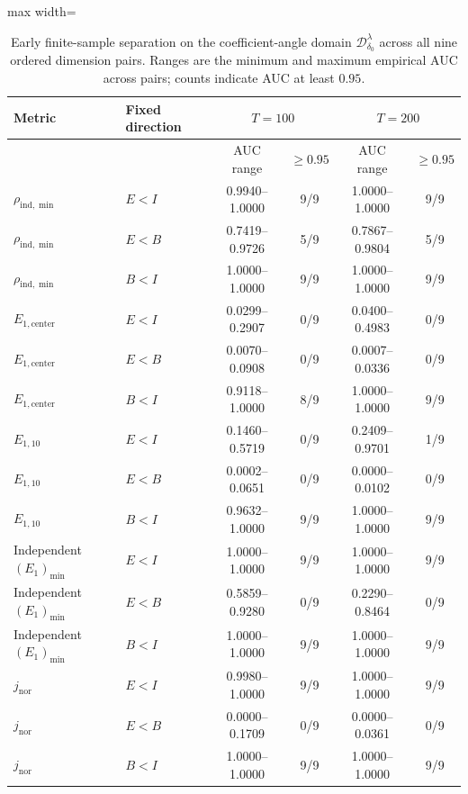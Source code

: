 \documentclass[12pt,letterpaper]{article}
\def\spacingset#1{\renewcommand{\baselinestretch}{#1}\small\normalsize}
\theoremstyle{plain}
\theoremstyle{definition}
\begin{document}
\begin{table}[p]
\begingroup
\spacingset{1.0}
\small\centering
\caption{Early finite-sample separation on the coefficient-angle domain $\mathcal D^\lambda_{\delta_0}$ across all nine ordered dimension pairs. Ranges are the minimum and maximum empirical AUC across pairs; counts indicate AUC at least $0.95$.}
\label{s23:lambda:finite:auc}
\footnotesize
\setlength{\tabcolsep}{4pt}
\renewcommand{\arraystretch}{1.10}
\begin{adjustbox}{max width=\linewidth}
\begin{tabular}{llcccc}
\toprule
Metric & Fixed direction & \multicolumn{2}{c}{$T=100$} & \multicolumn{2}{c}{$T=200$}\\
\midrule
 &  & AUC range & $\ge0.95$ & AUC range & $\ge0.95$\\
$\rho_{\mathrm{ind},\min}$ & $E<I$ & 0.9940--1.0000 & 9/9 & 1.0000--1.0000 & 9/9\\
$\rho_{\mathrm{ind},\min}$ & $E<B$ & 0.7419--0.9726 & 5/9 & 0.7867--0.9804 & 5/9\\
$\rho_{\mathrm{ind},\min}$ & $B<I$ & 1.0000--1.0000 & 9/9 & 1.0000--1.0000 & 9/9\\
\addlinespace
$E_{1,\mathrm{center}}$ & $E<I$ & 0.0299--0.2907 & 0/9 & 0.0400--0.4983 & 0/9\\
$E_{1,\mathrm{center}}$ & $E<B$ & 0.0070--0.0908 & 0/9 & 0.0007--0.0336 & 0/9\\
$E_{1,\mathrm{center}}$ & $B<I$ & 0.9118--1.0000 & 8/9 & 1.0000--1.0000 & 9/9\\
\addlinespace
$E_{1,10}$ & $E<I$ & 0.1460--0.5719 & 0/9 & 0.2409--0.9701 & 1/9\\
$E_{1,10}$ & $E<B$ & 0.0002--0.0651 & 0/9 & 0.0000--0.0102 & 0/9\\
$E_{1,10}$ & $B<I$ & 0.9632--1.0000 & 9/9 & 1.0000--1.0000 & 9/9\\
\addlinespace
Independent $(E_1)_{\min}$ & $E<I$ & 1.0000--1.0000 & 9/9 & 1.0000--1.0000 & 9/9\\
Independent $(E_1)_{\min}$ & $E<B$ & 0.5859--0.9280 & 0/9 & 0.2290--0.8464 & 0/9\\
Independent $(E_1)_{\min}$ & $B<I$ & 1.0000--1.0000 & 9/9 & 1.0000--1.0000 & 9/9\\
\addlinespace
$j_{\mathrm{nor}}$ & $E<I$ & 0.9980--1.0000 & 9/9 & 1.0000--1.0000 & 9/9\\
$j_{\mathrm{nor}}$ & $E<B$ & 0.0000--0.1709 & 0/9 & 0.0000--0.0361 & 0/9\\
$j_{\mathrm{nor}}$ & $B<I$ & 1.0000--1.0000 & 9/9 & 1.0000--1.0000 & 9/9\\

\end{tabular}
\end{adjustbox}
\end{table}
\end{document}
